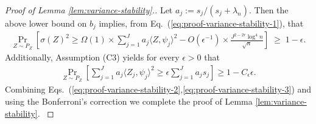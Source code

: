 \documentclass[11pt,a4paper]{article}
\renewcommand{\hat}{\widehat}
\theoremstyle{definition}
\theoremstyle{plain}
\newtheorem{lemma}{Lemma}[section]
\theoremstyle{remark}
\newcommand{\pd}[1]{
	{ \color{blue} PD: #1}
}
\begin{document}
\begin{proof}[Proof of Lemma \ref{lem:variance-stability}.]
{Let $a_j := s_j/(s_j+\lambda_n)$. Then the above lower bound on $b_j$ implies, from Eq.~(\ref{eq:proof-variance-stability-1}), that
\begin{align}
\Pr_{Z\sim P_Z}\left[\sigma(Z)^2\geq \Omega(1)\times \sum_{j=1}^J a_j\langle Z,\psi_j\rangle^2 - O(\epsilon^{-1})\times\frac{J^{2-2r}\log^4 n}{\sqrt{n}}\right] \;\geq\; 1-\epsilon.
\label{eq:proof-variance-stability-2}
\end{align}
Additionally, Assumption (C3) yields for every $\epsilon>0$ that
\begin{align}
\Pr_{Z\sim P_Z}\left[\sum_{j=1}^J a_j\langle Z_j,\psi_j\rangle^2 \geq \epsilon\sum_{j=1}^J a_js_j\right] \geq 1-C_\epsilon\epsilon.
\label{eq:proof-variance-stability-3}
\end{align}
Combining Eqs.~(\ref{eq:proof-variance-stability-2},\ref{eq:proof-variance-stability-3}) and using the Bonferroni's correction we complete the proof of Lemma \ref{lem:variance-stability}.
}
%
%
\end{proof}
%
\end{document}
